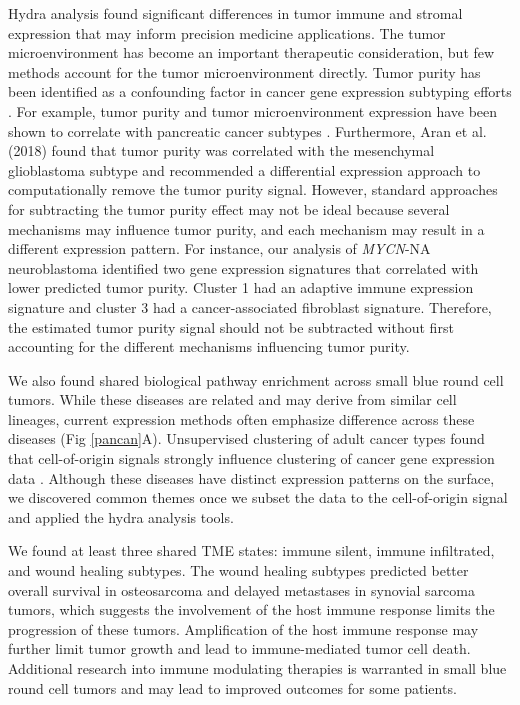 \documentclass[10pt,letterpaper]{article}
\begin{document}
Hydra analysis found significant differences in tumor immune and stromal expression that may inform precision medicine applications. The tumor microenvironment has become an important therapeutic consideration, but few methods account for the tumor microenvironment directly. Tumor purity has been identified as a confounding factor in cancer gene expression subtyping efforts \cite{rheeImpactTumorPurity2018}. For example, tumor purity and tumor microenvironment expression have been shown to correlate with pancreatic cancer subtypes \cite{raphael2017integrated}. Furthermore, Aran et al. (2018) found that tumor purity was correlated with the mesenchymal glioblastoma subtype and recommended a differential expression approach to computationally remove the tumor purity signal. However, standard approaches for subtracting the tumor purity effect may not be ideal because several mechanisms may influence tumor purity, and each mechanism may result in a different expression pattern. For instance, our analysis of \textit{MYCN}-NA neuroblastoma identified two gene expression signatures that correlated with lower predicted tumor purity. Cluster 1 had an adaptive immune expression signature and cluster 3 had a cancer-associated fibroblast signature. Therefore, the estimated tumor purity signal should not be subtracted without first accounting for the different mechanisms influencing tumor purity.

We also found shared biological pathway enrichment across small blue round cell tumors. While these diseases are related and may derive from similar cell lineages, current expression methods often emphasize difference across these diseases (Fig \ref{pancan}A). Unsupervised clustering of adult cancer types found that cell-of-origin signals strongly influence clustering of cancer gene expression data \cite{hoadleyCellofOriginPatternsDominate2018}. Although these diseases have distinct expression patterns on the surface, we discovered common themes once we subset the data to the cell-of-origin signal and applied the hydra analysis tools.

We found at least three shared TME states: immune silent, immune infiltrated, and wound healing subtypes. The wound healing subtypes predicted better overall survival in osteosarcoma and delayed metastases in synovial sarcoma tumors, which suggests the involvement of the host immune response limits the progression of these tumors. Amplification of the host immune response may further limit tumor growth and lead to immune-mediated tumor cell death. Additional research into immune modulating therapies is warranted in small blue round cell tumors and may lead to improved outcomes for some patients.
\end{document}

